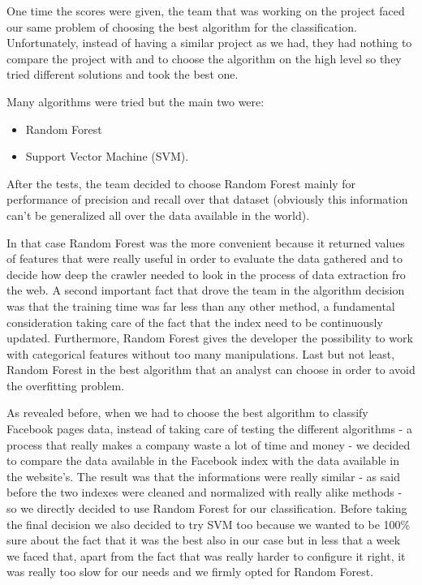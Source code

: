 One time the scores were given, the team that was working on the project faced our same problem of choosing the best algorithm for the classification. Unfortunately, instead of having a similar project as we had, they had nothing to compare the project with and to choose the algorithm on the high level so they tried different solutions and took the best one.

Many algorithms were tried but the main two were:
\begin{itemize}
\item Random Forest
\item Support Vector Machine (SVM).
\end{itemize}

After the tests, the team decided to choose Random Forest mainly for performance of precision and recall over that dataset (obviously this information can't be generalized all over the data available in the world).

In that case Random Forest was the more convenient because it returned values of features that were really useful in order to evaluate the data gathered and to decide how deep the crawler needed to look in the process of data extraction fro the web.
A second important fact that drove the team in the algorithm decision was that the training time was far less than any other method, a fundamental consideration taking care of the fact that the index need to be continuously updated. Furthermore, Random Forest gives the developer the possibility to work with categorical features without too many manipulations. 
Last but not least, Random Forest in the best algorithm that an analyst can choose in order to avoid the overfitting problem.

As revealed before, when we had to choose the best algorithm to classify Facebook pages data, instead of taking care of testing the different algorithms - a process that really makes a company waste a lot of time and money -  we decided to compare the data available in the Facebook index with the data available in the website's. The result was that the informations were really similar - as said before the two indexes were cleaned and normalized with really alike methods - so we directly decided to use Random Forest for our classification. Before taking the final decision we also decided to try SVM too because we wanted to be 100\% sure about the fact that it was the best also in our case but in less that a week we faced that, apart from the fact that was really harder to configure it right, it was really too slow for our needs and we firmly opted for Random Forest.


